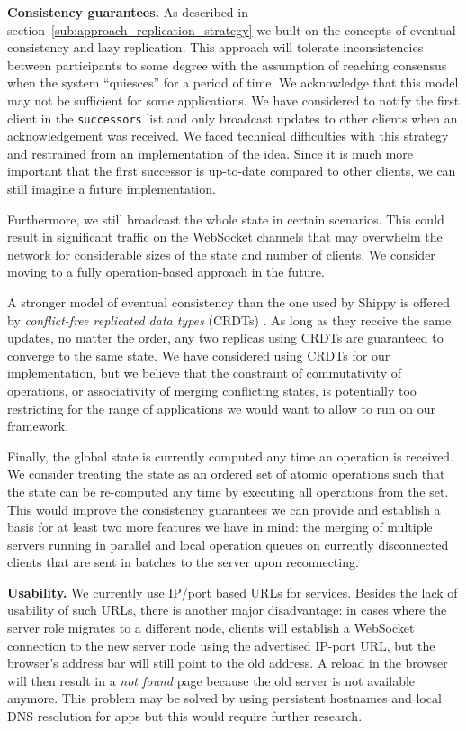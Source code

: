 \textbf{Consistency guarantees.}
As described in section~\ref{sub:approach_replication_strategy} we built \APIName on the concepts of eventual consistency and lazy replication. 
This approach will tolerate inconsistencies between participants to some degree with the assumption of reaching consensus when the system ``quiesces'' for a period of time. 
We acknowledge that this model may not be sufficient for some applications. 
We have considered to notify the first client in the \texttt{successors} list and only broadcast updates to other clients when an acknowledgement was received.
We faced technical difficulties with this strategy and restrained from an implementation of the idea.
Since it is much more important that the first successor is up-to-date compared to other clients, we can still imagine a future implementation.

Furthermore, we still broadcast the whole state in certain scenarios.
This could result in significant traffic on the WebSocket channels that may overwhelm the network for considerable sizes of the state and number of clients. 
We consider moving to a fully operation-based approach in the future.

A stronger model of eventual consistency than the one used by Shippy is offered by \textit{conflict-free replicated data types} (CRDTs) \cite{Shapiro:2011}.
As long as they receive the same updates, no matter the order, any two replicas using CRDTs are guaranteed to converge to the same state.
We have considered using CRDTs for our implementation, but we believe that the constraint of commutativity of operations, or associativity of merging conflicting states, is potentially too restricting for the range of applications we would want to allow to run on our framework.

Finally, the global state is currently computed any time an operation is received. We consider treating the state as an ordered set of atomic operations such that the state can be re-computed any time by executing all operations from the set. This would improve the consistency guarantees we can provide and establish a basis for at least two more features we have in mind: the merging of multiple servers running in parallel and local operation queues on currently disconnected clients that are sent in batches to the server upon reconnecting.

\textbf{Usability.}
We currently use IP/port based URLs for \APIshort services. Besides the lack of usability of such URLs, there is another major disadvantage: in cases where the server role migrates to a different node, clients will establish a WebSocket connection to the new server node using the advertised IP-port URL, but the browser's address bar will still point to the old address. A reload in the browser will then result in a \textit{not found} page because the old server is not available anymore. This problem may be solved by using persistent hostnames and local DNS resolution for \APIshort apps but this would require further research.

